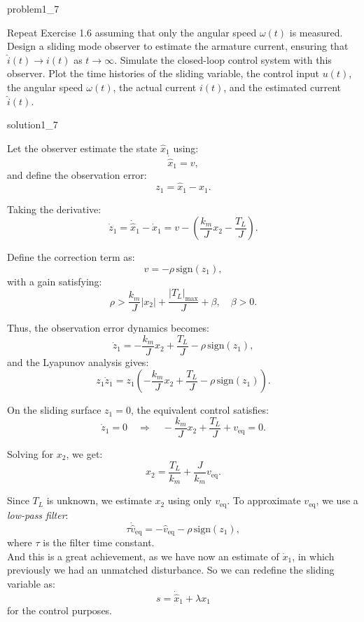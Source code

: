 \begin{problem}{1.7}{problem1_7}

Repeat Exercise 1.6 assuming that only the angular speed \( \omega(t) \) is measured. Design a sliding mode observer to estimate the armature current, ensuring that \( \hat{i}(t) \to i(t) \) as \( t \to \infty \). Simulate the closed-loop control system with this observer. Plot the time histories of the sliding variable, the control input \( u(t) \), the angular speed \( \omega(t) \), the actual current \( i(t) \), and the estimated current \( \hat{i}(t) \).

\end{problem}

\begin{solution}{}{solution1_7}

	Let the observer estimate the state \( \hat{x}_1 \) using:
	\[
		\dot{\hat{x}}_1 = v,
	\]
	and define the observation error:
	\[
		z_1 = \hat{x}_1 - x_1.
	\]

	Taking the derivative:
	\[
		\dot{z}_1 = \dot{\hat{x}}_1 - \dot{x}_1 = v - \left(\frac{k_m}{J}x_2 - \frac{T_L}{J}\right).
	\]

	Define the correction term as:
	\[
		v = -\rho \, \text{sign}(z_1),
	\]
	with a gain satisfying:
	\[
		\rho > \frac{k_m}{J} |x_2| + \frac{|T_L|_{\max}}{J} + \beta, \quad \beta > 0.
	\]

	Thus, the observation error dynamics becomes:
	\[
		\dot{z}_1 = -\frac{k_m}{J} x_2 + \frac{T_L}{J} - \rho \, \text{sign}(z_1),
	\]
	and the Lyapunov analysis gives:
	\[
		z_1 \dot{z}_1 = z_1 \left(-\frac{k_m}{J} x_2 + \frac{T_L}{J} - \rho \, \text{sign}(z_1)\right).
	\]

	On the sliding surface \( z_1 = 0 \), the equivalent control satisfies:
	\[
		\dot{z}_1 = 0 \quad \Rightarrow \quad -\frac{k_m}{J} x_2 + \frac{T_L}{J} + v_{\text{eq}} = 0.
	\]

	Solving for \( x_2 \), we get:
	\[
		x_2 = \frac{T_L}{k_m} + \frac{J}{k_m} v_{\text{eq}}.
	\]

	Since \( T_L \) is unknown, we estimate \( x_2 \) using only \( v_{\text{eq}} \). To approximate \( v_{\text{eq}} \), we use a \emph{low-pass filter}:
	\[
		\tau \dot{\hat{v}}_{\text{eq}} = -\hat{v}_{\text{eq}} - \rho \, \text{sign}(z_1),
	\]
	where \( \tau \) is the filter time constant.\\

    And this is a great achievement, as we have now an estimate of $\dot{x}_1$, in which previously we had an unmatched disturbance. So we can redefine the sliding variable as:
    \[
        s = \dot{\hat{x}}_1 + \lambda x_1
    \]
    for the control purposes.\\


\end{solution}
